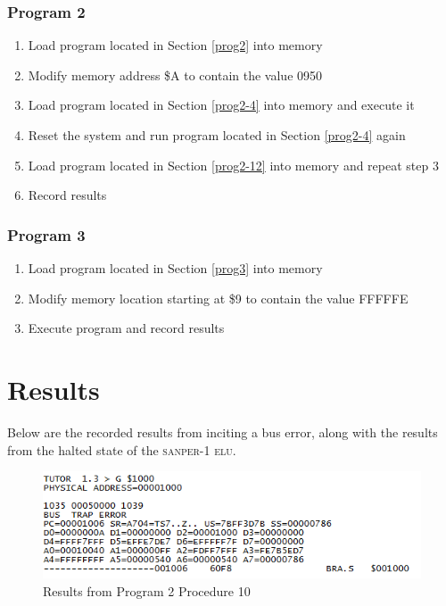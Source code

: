 \documentclass[12pt, twocolumn]{article}
\begin{document}
\subsubsection{Program 2}
\begin{enumerate}
	\item Load program located in Section \ref{prog2} into memory
	\item Modify memory address \$A to contain the value 0950 
	\item Load program located in Section \ref{prog2-4} into memory and execute it
	\item Reset the system and run program located in Section \ref{prog2-4} again
	\item Load program located in Section \ref{prog2-12} into memory and repeat step 3
	\item Record results
	
\end{enumerate}
\subsubsection{Program 3}
\begin{enumerate}
	\item Load program located in Section \ref{prog3} into memory
	\item Modify memory location starting at \$9 to contain the value FFFFFE
	\item Execute program and record results
\end{enumerate}
\section{Results}
Below are the recorded results from inciting a bus error, along with the results from the halted state of the \textsc{sanper-1 elu}.
\begin{figure}[h!]
\centering
\includegraphics[width=1\linewidth]{3_2_10}
\caption{Results from Program 2 Procedure 10}
\label{fig:3_2_10}
\end{figure}
\end{document}

